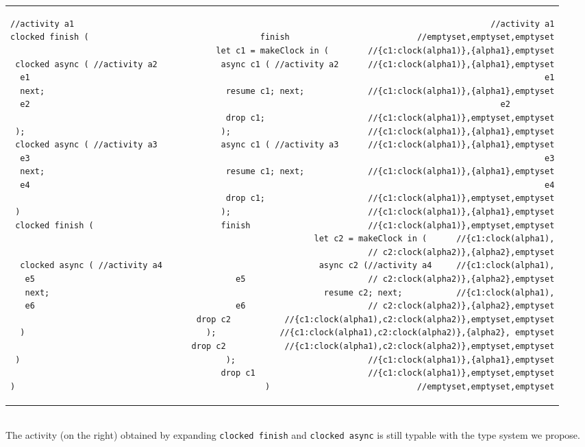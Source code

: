 \begin{tabular}{l|r}
\!\!\!\!\!
\begin{lstlisting}[boxpos=t]
//activity a1
clocked finish (

 clocked async ( //activity a2
  e1
  next;
  e2

 );
 clocked async ( //activity a3
  e3
  next;
  e4

 )
 clocked finish (


  clocked async ( //activity a4
   e5
   next;
   e6

  )

 )

)
\end{lstlisting}
\!\!
&
\begin{lstlisting}[boxpos=t]
//activity a1
finish                          //emptyset,emptyset,emptyset
 let c1 = makeClock in (        //{c1:clock(alpha1)},{alpha1},emptyset
  async c1 ( //activity a2      //{c1:clock(alpha1)},{alpha1},emptyset
   e1
   resume c1; next;             //{c1:clock(alpha1)},{alpha1},emptyset
   e2         
   drop c1;                     //{c1:clock(alpha1)},emptyset,emptyset
  );                            //{c1:clock(alpha1)},{alpha1},emptyset
  async c1 ( //activity a3      //{c1:clock(alpha1)},{alpha1},emptyset
   e3
   resume c1; next;             //{c1:clock(alpha1)},{alpha1},emptyset
   e4
   drop c1;                     //{c1:clock(alpha1)},emptyset,emptyset
  );                            //{c1:clock(alpha1)},{alpha1},emptyset
  finish                        //{c1:clock(alpha1)},emptyset,emptyset
   let c2 = makeClock in (      //{c1:clock(alpha1),
                                // c2:clock(alpha2)},{alpha2},emptyset
    async c2 (//activity a4     //{c1:clock(alpha1),
     e5                         // c2:clock(alpha2)},{alpha2},emptyset
     resume c2; next;           //{c1:clock(alpha1),
     e6                         // c2:clock(alpha2)},{alpha2},emptyset
     drop c2           //{c1:clock(alpha1),c2:clock(alpha2)},emptyset,emptyset
    );             //{c1:clock(alpha1),c2:clock(alpha2)},{alpha2}, emptyset
    drop c2            //{c1:clock(alpha1),c2:clock(alpha2)},emptyset,emptyset
   );                           //{c1:clock(alpha1)},{alpha1},emptyset
  drop c1                       //{c1:clock(alpha1)},emptyset,emptyset
 )                              //emptyset,emptyset,emptyset
\end{lstlisting}
\end{tabular}
~\\
The activity (on the right) obtained by expanding
\lstinline[morekeywords=clocked]{clocked finish} and
\lstinline[morekeywords=clocked]{clocked async} is still typable with
the type system we propose.

